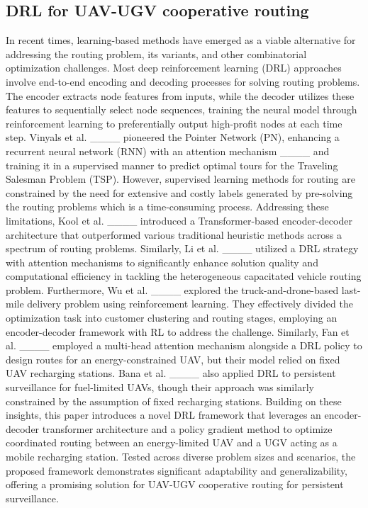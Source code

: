 \subsection{DRL for UAV-UGV cooperative routing}

In recent times, learning-based methods have emerged as a viable alternative for addressing the routing problem, its variants, and other combinatorial optimization challenges. Most deep reinforcement learning (DRL) approaches involve end-to-end encoding and decoding processes for solving routing problems. The encoder extracts node features from inputs, while the decoder utilizes these features to sequentially select node sequences, training the neural model through reinforcement learning to preferentially output high-profit nodes at each time step. Vinyals et al. ____ pioneered the Pointer Network (PN), enhancing a recurrent neural network (RNN) with an attention mechanism ____ and training it in a supervised manner to predict optimal tours for the Traveling Salesman Problem (TSP). However, supervised learning methods for routing are constrained by the need for extensive and costly labels generated by pre-solving the routing problems which is a time-consuming process. Addressing these limitations, Kool et al. ____ introduced a Transformer-based encoder-decoder architecture that outperformed various traditional heuristic methods across a spectrum of routing problems. Similarly, Li et al. ____ utilized a DRL strategy with attention mechanisms to significantly enhance solution quality and computational efficiency in tackling the heterogeneous capacitated vehicle routing problem. Furthermore, Wu et al. ____ explored the truck-and-drone-based last-mile delivery problem using reinforcement learning. They effectively divided the optimization task into customer clustering and routing stages, employing an encoder-decoder framework with RL to address the challenge. Similarly, Fan et al. ____ employed a multi-head attention mechanism alongside a DRL policy to design routes for an energy-constrained UAV, but their model relied on fixed UAV recharging stations. Bana et al. ____ also applied DRL to persistent surveillance for fuel-limited UAVs, though their approach was similarly constrained by the assumption of fixed recharging stations. Building on these insights, this paper introduces a novel DRL framework that leverages an encoder-decoder transformer architecture and a policy gradient method to optimize coordinated routing between an energy-limited UAV and a UGV acting as a mobile recharging station. Tested across diverse problem sizes and scenarios, the proposed framework demonstrates significant adaptability and generalizability, offering a promising solution for UAV-UGV cooperative routing for persistent surveillance.
